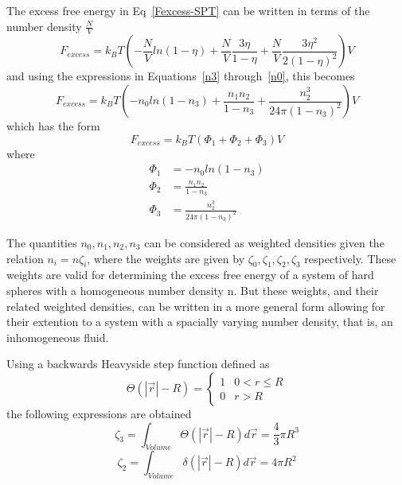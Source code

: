 \documentclass[double,12pt]{beavtex}
\begin{document}
\noindent The excess free energy in Eq~\ref{Fexcess-SPT} can be written 
in terms of the number density $\frac{N}{V}$
\begin{equation}{F_{excess}=k_{B}T\left(-\frac{N}{V}ln(1-\eta)+\frac{N}{V}\frac{3\eta}{1-\eta}+\frac{N}{V}\frac{3{\eta}^2}{2(1-\eta)^2}\right)V}\end{equation}
and using the expressions in Equations~\ref{n3} through~\ref{n0}, this becomes
\begin{equation}\label{FexfromSPT}{F_{excess}=k_{B}T\left(-n_{0}ln(1-n_{3})+\frac{n_{1}n_{2}}{1-n_{3}}+\frac{n_{2}^3}{24\pi(1-n_{3})^2}\right)V}\end{equation}
which has the form 
\begin{equation}{F_{excess} = k_BT(\Phi_1+\Phi_2+\Phi_3)V}\end{equation}
where 
\begin{align}
   \Phi_1 &= -n_{0}ln(1-n_{3}) \\
   \Phi_2 &= \frac{n_{1}n_{2}}{1-n_{3}} \\
   \Phi_3 &= \frac{n_{2}^3}{24\pi(1-n_{3})^2} 
\end{align}

The quantities $n_{0},n_{1},n_{2},n_{3}$ can be considered as weighted 
densities given the relation $n_{i}=n\zeta_{i}$, where the weights are 
given by $\zeta_{0},\zeta_{1},\zeta_{2},\zeta_{3}$ respectively. These 
weights are valid for determining the excess free energy of a system of 
hard spheres with a homogeneous number density n. But these weights, and 
their related  weighted densities, can be written in a more general form 
allowing for their extention to a system with a spacially varying number 
density, that is, an inhomogeneous fluid. 

Using a backwards Heavyside step function defined as
\begin{displaymath}{\Theta(|\vec{r}|-R)=\left\{ \begin{array}{rc} 1 & 0<r \leq R \\ 0  & r>R \end{array}\right.}\end{displaymath}
the following expressions are obtained
\begin{equation}{\zeta_{3}=\int_{Volume}{\Theta(|\vec{r}|-R)d{\vec{r}}} = \frac{4}{3}\pi{R^3}}\end{equation}
\begin{equation}{\zeta_{2}=\int_{Volume}{\delta(|\vec{r}|-R)d{\vec{r}}} = 4\pi{R^2}}\end{equation}
\end{document}
